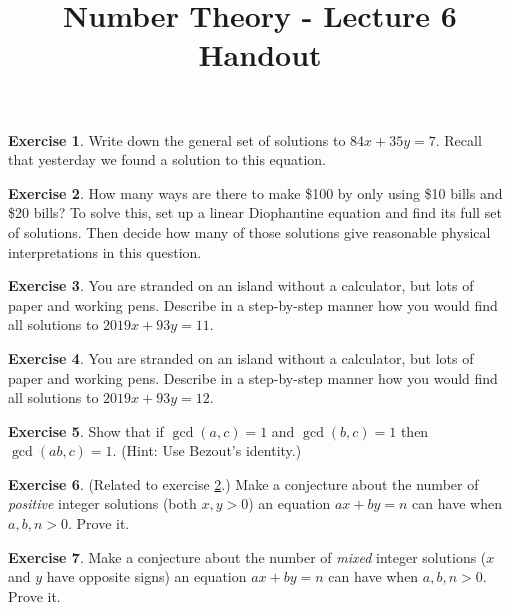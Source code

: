 \documentclass[11pt]{article}
\theoremstyle{definition}
\newtheorem{exercise}{Exercise}
\numberwithin{thm}{section}
\begin{document}
\title{Number Theory - Lecture 6 Handout}

\maketitle


\begin{exercise} Write down the general set of solutions to $84x + 35y = 7$. Recall that yesterday we found a solution to this equation.
\end{exercise}

\begin{exercise} \label{ex:bens} How many ways are there to make \$100 by only using \$10 bills and \$20 bills? To solve this, set up a linear Diophantine equation and find its full set of solutions. Then decide how many of those solutions give reasonable physical interpretations in this question.
\end{exercise}

\begin{exercise} You are stranded on an island without a calculator, but lots of paper and working pens. Describe in a step-by-step manner how you would find all solutions to $2019x + 93y = 11$.
\end{exercise}

\begin{exercise} You are stranded on an island without a calculator, but lots of paper and working pens. Describe in a step-by-step manner how you would find all solutions to $2019x + 93y = 12$.
\end{exercise}

\begin{exercise} Show that if $\gcd(a,c)=1$ and $\gcd(b,c)=1$ then $\gcd(ab,c) = 1$. (Hint: Use Bezout's identity.)
\end{exercise}

\begin{exercise} (Related to exercise \ref{ex:bens}.) Make a conjecture about the number of \textit{positive} integer solutions (both $x,y>0$) an equation $ax+by=n$ can have when $a,b,n >0$. Prove it. 
\end{exercise}

\begin{exercise} Make a conjecture about the number of \textit{mixed} integer solutions ($x$ and $y$ have opposite signs) an equation $ax+by=n$ can have when $a,b,n >0$. Prove it. 
\end{exercise}
\end{document}
